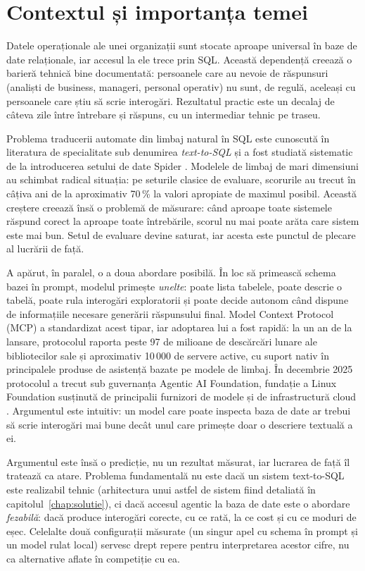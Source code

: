 \documentclass[12pt,a4paper]{report}
\begin{document}
\section{Contextul și importanța temei}

Datele operaționale ale unei organizații sunt stocate aproape universal în
baze de date relaționale, iar accesul la ele trece prin SQL. Această
dependență creează o barieră tehnică bine documentată: persoanele care au
nevoie de răspunsuri (analiști de business, manageri, personal operativ) nu sunt, de regulă, aceleași cu persoanele care știu să scrie interogări.
Rezultatul practic este un decalaj de câteva zile între întrebare și
răspuns, cu un intermediar tehnic pe traseu.

Problema traducerii automate din limbaj natural în SQL este cunoscută în
literatura de specialitate sub denumirea \emph{text-to-SQL} și a fost
studiată sistematic de la introducerea setului de date Spider \cite{spider}.
Modelele de limbaj de mari dimensiuni au schimbat radical situația: pe
seturile clasice de evaluare, scorurile au trecut în câțiva ani de la
aproximativ 70\,\% la valori apropiate de maximul posibil. Această creștere
creează însă o problemă de măsurare: când aproape toate sistemele răspund
corect la aproape toate întrebările, scorul nu mai poate arăta care sistem
este mai bun. Setul de evaluare devine saturat, iar acesta este punctul de
plecare al lucrării de față.

A apărut, în paralel, o a doua abordare posibilă. În loc să primească schema
bazei în prompt, modelul primește \emph{unelte}: poate lista tabelele, poate
descrie o tabelă, poate rula interogări exploratorii și poate decide autonom
când dispune de informațiile necesare generării răspunsului final. Model Context Protocol (MCP) \cite{mcp} a standardizat acest tipar, iar
adoptarea lui a fost rapidă: la un an de la lansare, protocolul raporta peste
97 de milioane de descărcări lunare ale bibliotecilor sale și aproximativ
10\,000 de servere active, cu suport nativ în principalele produse de
asistență bazate pe modele de limbaj. În decembrie 2025 protocolul a trecut
sub guvernanța Agentic AI Foundation, fundație a Linux Foundation susținută
de principalii furnizori de modele și de infrastructură cloud \cite{aaif}. Argumentul este intuitiv: un model care
poate inspecta baza de date ar trebui să scrie interogări mai bune decât
unul care primește doar o descriere textuală a ei.

Argumentul este însă o predicție, nu un rezultat măsurat, iar lucrarea de
față îl tratează ca atare. Problema fundamentală nu este dacă un sistem text-to-SQL
este realizabil tehnic (arhitectura unui astfel de sistem fiind detaliată în capitolul~\ref{chap:solutie}), ci dacă accesul
agentic la baza de date este o abordare \emph{fezabilă}: dacă produce
interogări corecte, cu ce rată, la ce cost și cu ce moduri de eșec. Celelalte
două configurații măsurate (un singur apel cu schema în prompt și un model
rulat local) servesc drept repere pentru interpretarea acestor cifre, nu
ca alternative aflate în competiție cu ea.
\end{document}
